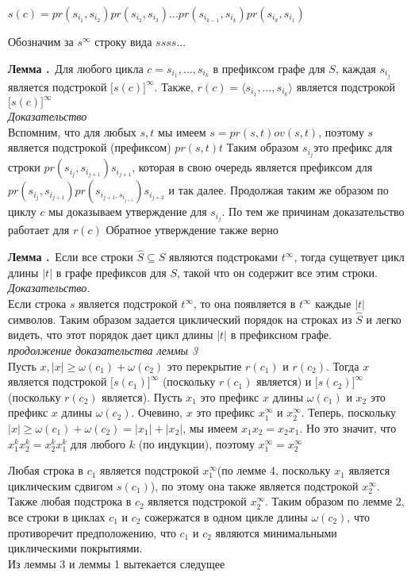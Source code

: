 \documentclass[11pt,a4paper]{article}
\newcommand\ifnonempty[2]{\ifthenelse{\equal{#1}{}}{}{#2}}
\newcounter{lem}
\newcommand{\lem}[1][]{\smallskip\par\hangafter=1\normalsize\textbf{Лемма \refstepcounter{lem}\thelem\ifnonempty{#1}{ (#1)}.}~}
\begin{document}
\begin{center}
$s(c) = pr(s_{i_1}, s_{i_2})pr(s_{i_2}, s_{i_3})...pr(s_{i_{k - 1}}, s_{i_k})pr(s_{i_k}, s_{i_1})$
\end{center}
Обозначим за $s^{\infty}$ строку вида $ssss...$
\lem Для любого цикла $c = s_{i_1}, ..., s_{i_k}$ в префиксом графе для $S$, каждая $s_{i_j}$ является подстрокой
$\lbrack s(c)\rbrack^{\infty}$. Также, $r(c) = \langle s_{i_1}, ..., s_{i_k} \rangle$ является подстрокой $\lbrack s(c)\rbrack^{\infty}$\\
\textit{Доказательство}\\
Вспомним, что для любых $s, t$ мы имеем $s = pr(s, t)ov(s, t)$, поэтому $s$ является подстрокой (префиксом) $pr(s, t)t$
Таким образом $s_{i_j}$это префикс для строки $pr(s_{i_j}, s_{i_{j+1}})s_{i_{j + 1}}$, которая в свою очередь является префиксом для
$pr(s_{i_j}, s_{i_{j + 1}})pr(s_{i_{j + 1}, s_{i_{j + 1}}})s_{i_{j + 2}}$ и так далее. Продолжая таким же образом по циклу $c$ мы доказываем
утверждение для $s_{i_j}$. По тем же причинам доказательство работает для $r(c)$
Обратное утверждение также верно
\lem Если все строки $\hat{S} \subseteq S$ являются подстроками $t^\infty$, тогда сущетвует цикл длины $|t|$ в графе префиксов для $S$,
такой что он содержит все этим строки.\\
\textit{Доказательство.}\\
Если строка $s$ является подстрокой $t^\infty$, то она появляется в $t^\infty$ каждые $|t|$ символов. Таким образом задается циклический порядок
на строках из $\hat{S}$ и легко видеть, что этот порядок дает цикл длины $|t|$ в префиксном графе.\\
\textit{продолжение доказательства леммы 3}\\
Пусть $x, |x| \ge \omega(c_1) + \omega(c_2)$ это перекрытие $r(c_1)$ и $r(c_2)$. Тогда $x$ является подстрокой $\lbrack s(c_1) \rbrack^\infty$
(поскольку $r(c_1)$ является) и $\lbrack s(c_2) \rbrack^\infty$ (поскольку $r(c_2)$ является).
Пусть $x_1$ это префикс $x$ длины $\omega(c_1)$ и $x_2$ это префикс $x$ длины $\omega(c_2)$. Очевино, $x$ это префикс $x_1^\infty$ и $x_2^\infty.$
Теперь, поскольку $|x| \ge \omega(c_1) + \omega(c_2) = |x_1| + |x_2|$, мы имеем $x_1 x_2 = x_2 x_1$. Но это значит, что $x_1^k x_2^k = x_2^k x_1^k$
для любого $k$ (по индукции), поэтому $x_1^\infty = x_2^\infty$
\par
Любая строка в $c_1$ является подстрокой $x_1^\infty$(по лемме 4, поскольку $x_1$ является циклическим сдвигом $s(c_1)$), по этому она также является
подстрокой $x_2^\infty$. Также любая подстрока в $c_2$ является подстрокой $x_2^\infty$. Таким образом по лемме 2, все строки в циклах $c_1$ и $c_2$
сожержатся в одном цикле длины $\omega(c_2)$, что противоречит предположению, что $c_1$ и $c_2$ являются минимальными циклическими покрытиями.
\\
Из леммы 3 и леммы 1 вытекается следущее
\end{document}
